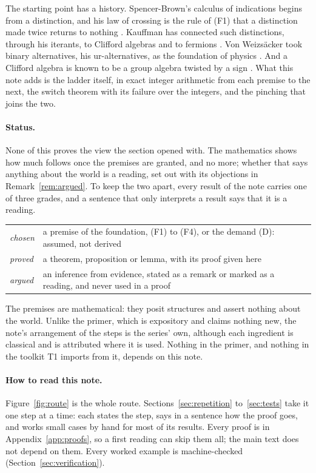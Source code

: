 \documentclass[11pt]{article}
\theoremstyle{plain}
\theoremstyle{definition}
\theoremstyle{plain}
\theoremstyle{definition}
\begin{document}
The starting point has a history. Spencer-Brown's calculus of indications begins from a distinction, and his law of crossing is the rule of (F1) that a distinction made twice returns to nothing \cite{SpencerBrown1969}. Kauffman has connected such distinctions, through his iterants, to Clifford algebras and to fermions \cite{Kauffman2021}. Von Weizs\"acker took binary alternatives, his ur-alternatives, as the foundation of physics \cite{Weizsacker1985}. And a Clifford algebra is known to be a group algebra twisted by a sign \cite{AlbuquerqueMajid2002}. What this note adds is the ladder itself, in exact integer arithmetic from each premise to the next, the switch theorem with its failure over the integers, and the pinching that joins the two.

\paragraph{Status.} None of this proves the view the section opened with. The mathematics shows how much follows once the premises are granted, and no more; whether that says anything about the world is a reading, set out with its objections in Remark~\ref{rem:argued}. To keep the two apart, every result of the note carries one of three grades, and a sentence that only interprets a result says that it is a reading.
\begin{center}
\begin{tabular}{@{}lp{}@{}}
\toprule
\emph{chosen} & a premise of the foundation, (F1) to (F4), or the demand (D): assumed, not derived \\
\emph{proved} & a theorem, proposition or lemma, with its proof given here \\
\emph{argued} & an inference from evidence, stated as a remark or marked as a reading, and never used in a proof \\
\bottomrule
\end{tabular}
\end{center}
The premises are mathematical: they posit structures and assert nothing about the world. Unlike the primer, which is expository and claims nothing new, the note's arrangement of the steps is the series' own, although each ingredient is classical and is attributed where it is used. Nothing in the primer, and nothing in the toolkit T1 imports from it, depends on this note.

\paragraph{How to read this note.} Figure~\ref{fig:route} is the whole route. Sections~\ref{sec:repetition} to~\ref{sec:tests} take it one step at a time: each states the step, says in a sentence how the proof goes, and works small cases by hand for most of its results. Every proof is in Appendix~\ref{app:proofs}, so a first reading can skip them all; the main text does not depend on them. Every worked example is machine-checked (Section~\ref{sec:verification}).
\end{document}
